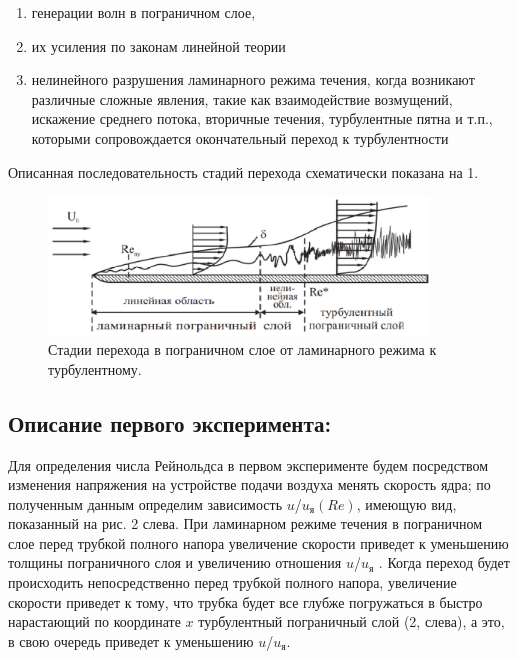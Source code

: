 \documentclass[a4paper]{article}
\begin{document}
\begin{enumerate} 
  \item генерации волн в пограничном слое,
  \item  их усиления по законам линейной теории
  \item нелинейного разрушения ламинарного режима течения, когда возникают различные сложные явления, такие как взаимодействие возмущений, искажение среднего потока, вторичные течения, турбулентные пятна и т.п., которыми сопровождается окончательный переход к
турбулентности
\end{enumerate}
\par
Описанная последовательность стадий перехода схематически показана на 1.

\begin {figure}[H]
\begin{center}
\par
\includegraphics[width=0.9\textwidth]{01.png}
\caption{Стадии перехода в пограничном слое от ламинарного режима к турбулентному.}
\end{center}
\end {figure}

\subsection*{Описание первого эксперимента:}
Для определения числа Рейнольдса в первом эксперименте будем посредством изменения напряжения на
устройстве подачи воздуха менять скорость ядра; по полученным данным определим зависимость $u$/$u_\text{я}(Re)$, имеющую вид, показанный на рис. 2 слева. При ламинарном режиме течения в пограничном слое перед трубкой
полного напора увеличение скорости приведет к уменьшению толщины пограничного слоя и увеличению отношения $u$/$u_\text{я}$ . Когда переход будет происходить непосредственно перед трубкой полного напора, увеличение
скорости приведет к тому, что трубка будет все глубже погружаться в быстро нарастающий по координате $x$ турбулентный пограничный слой (2, слева), а это, в свою очередь приведет к уменьшению $u$/$u_\text{я}$.
\end{document}
